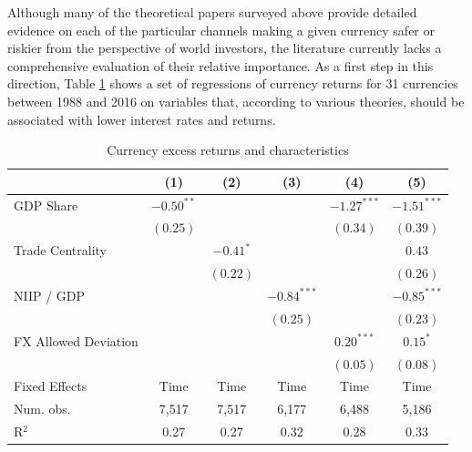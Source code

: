 \documentclass[11pt]{article}
\begin{document}
Although many of the theoretical papers surveyed above provide detailed evidence on each of the particular channels making a given currency safer or riskier from the perspective of world investors, the literature currently lacks a comprehensive evaluation of their relative importance. As a first step in this direction, Table \ref{table:rx_char} shows a set of regressions of currency returns for 31 currencies between 1988 and 2016 on variables that, according to various theories, should be associated with lower interest rates and returns. 
\begin{table}[htp]
\begin{center}
\caption{Currency excess returns and characteristics}
\label{table:rx_char}
\vspace{1em}
\begin{tabular}{l c c c c c }
\hline
\hline
 & (1) & (2) & (3) & (4) & (5) \\
\hline
GDP Share               & $-0.50^{**}$ &             &               & $-1.27^{***}$ & $-1.51^{***}$ \\
                        & $(0.25)$     &             &               & $(0.34)$      & $(0.39)$      \\
Trade Centrality              &              & $-0.41^{*}$ &               &               & $0.43$        \\
                        &              & $(0.22)$    &               &               & $(0.26)$      \\
NIIP / GDP              &              &             & $-0.84^{***}$ &               & $-0.85^{***}$ \\
                        &              &             & $(0.25)$      &               & $(0.23)$      \\
FX Allowed Deviation         &              &             &               & $0.20^{***}$  & $0.15^{*}$    \\
                        &              &             &               & $(0.05)$      & $(0.08)$      \\
\hline
Fixed Effects & Time & Time & Time & Time & Time \\
Num. obs.     & 7,517        & 7,517     & 6,177          & 6,488          & 5,186          \\
R$^2$         & 0.27        & 0.27     & 0.32          & 0.28          & 0.33          \\
\hline
\hline
\end{tabular}
\end{center}

\end{table}
\end{document}
